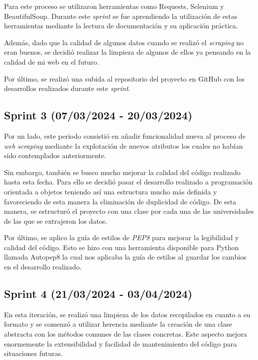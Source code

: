 Para este proceso se utilizaron herramientas como Requests, Selenium y BeautifulSoup. Durante este \textit{sprint} se fue aprendiendo la utilización de estas herramientas mediante la lectura de documentación y su aplicación práctica.

Además, dado que la calidad de algunos datos cuando se realizó el \textit{scraping} no eran buenos, se decidió realizar la limpieza de algunos de ellos ya pensando en la calidad de mi web en el futuro.

Por último, se realizó una subida al repositorio del proyecto en GitHub con los desarrollos realizados durante este \textit{sprint}.


\subsection{Sprint 3 (07/03/2024 -
20/03/2024)}
Por un lado, este periodo consistió en añadir funcionalidad nueva al proceso de \textit{web scraping} mediante la explotación de nuevos atributos los cuales no habían sido contemplados anteriormente.

Sin embargo, también se busco mucho mejorar la calidad del código realizado hasta esta fecha. Para ello se decidió pasar el desarrollo realizado a programación orientada a objetos teniendo así una estructura mucho más definida y favoreciendo de esta manera la eliminación de duplicidad de código. De esta manera, se estructuró el proyecto con una clase por cada una de las universidades de las que se extrajeron los datos.

Por último, se aplico la guía de estilos de \textit{PEP8}  para mejorar la legibilidad y calidad del código. Esto se hizo con una herramienta disponible para Python llamada Autopep8 \cite{autopep8:latex} la cual nos aplicaba la guía de estilos al guardar los cambios en el desarrollo realizado.


\subsection{Sprint 4 (21/03/2024 -
03/04/2024)}
En esta iteración, se realizó una limpieza de los datos recopilados en cuanto a su formato y se comenzó a utilizar herencia mediante la creación de una clase abstracta con los métodos comunes de las clases concretas. Este aspecto mejora enormemente la extensibilidad y facilidad de mantenimiento del código para situaciones futuras.


